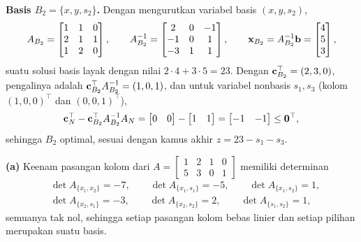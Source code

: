 \textbf{Basis $B_2 = \{x, y, s_2\}$.} Dengan mengurutkan variabel basis
$(x, y, s_2)$,
\[
A_{B_2} =
\begin{bmatrix}
1 & 1 & 0 \\
2 & 1 & 1 \\
1 & 2 & 0
\end{bmatrix},
\qquad
A_{B_2}^{-1} =
\begin{bmatrix}
2 & 0 & -1 \\
-1 & 0 & 1 \\
-3 & 1 & 1
\end{bmatrix},
\qquad
\mathbf{x}_{B_2} = A_{B_2}^{-1}\mathbf{b} = \begin{bmatrix} 4 \\ 5 \\ 3 \end{bmatrix},
\]
suatu solusi basis layak dengan nilai $2 \cdot 4 + 3 \cdot 5 = 23$. Dengan
$\mathbf{c}_{B_2}^\top = (2, 3, 0)$, pengalinya adalah
$\mathbf{c}_{B_2}^\top A_{B_2}^{-1} = (1, 0, 1)$, dan untuk variabel nonbasis
$s_1, s_3$ (kolom $(1,0,0)^\top$ dan $(0,0,1)^\top$),
\[
\mathbf{c}_N^\top - \mathbf{c}_{B_2}^\top A_{B_2}^{-1} A_N
= \begin{bmatrix} 0 & 0 \end{bmatrix}
- \begin{bmatrix} 1 & 1 \end{bmatrix}
= \begin{bmatrix} -1 & -1 \end{bmatrix} \leq \mathbf{0}^\top,
\]
sehingga $B_2$ optimal, sesuai dengan kamus akhir
$z = 23 - s_1 - s_3$.


\textbf{(a)} Keenam pasangan kolom dari
$A = \begin{bmatrix} 1 & 2 & 1 & 0 \\ 5 & 3 & 0 & 1 \end{bmatrix}$ memiliki
determinan
\[
\begin{aligned}
&\det A_{\{x_1,x_2\}} = -7,\qquad
\det A_{\{x_1,s_1\}} = -5,\qquad
\det A_{\{x_1,s_2\}} = 1,\\
&\det A_{\{x_2,s_1\}} = -3,\qquad
\det A_{\{x_2,s_2\}} = 2,\qquad
\det A_{\{s_1,s_2\}} = 1,
\end{aligned}
\]
semuanya tak nol, sehingga setiap pasangan kolom bebas linier dan setiap pilihan
merupakan suatu basis.

